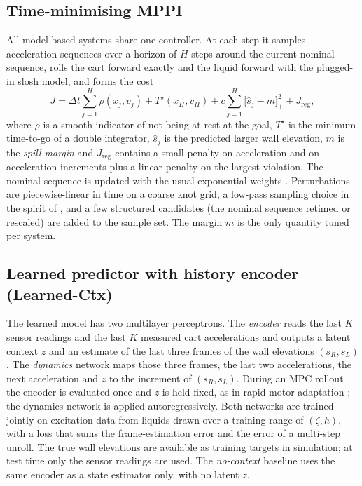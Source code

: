 \subsection{Time-minimising MPPI}
All model-based systems share one controller. At each step it samples acceleration sequences over a horizon of $H$ steps around the current nominal sequence, rolls the cart forward exactly and the liquid forward with the plugged-in slosh model, and forms the cost
\begin{equation}
J=\Delta t\sum_{j=1}^{H}\rho(x_j,v_j)+T^\star(x_H,v_H)+c\!\sum_{j=1}^{H}\!\big[\hat s_j-m\big]_+^2+J_{\mathrm{reg}},
\end{equation}
where $\rho$ is a smooth indicator of not being at rest at the goal, $T^\star$ is the minimum time-to-go of a double integrator, $\hat s_j$ is the predicted larger wall elevation, $m$ is the \emph{spill margin} and $J_{\mathrm{reg}}$ contains a small penalty on acceleration and on acceleration increments plus a linear penalty on the largest violation. The nominal sequence is updated with the usual exponential weights \cite{asmar2022model}. Perturbations are piecewise-linear in time on a coarse knot grid, a low-pass sampling choice in the spirit of \cite{kicki2025lp}, and a few structured candidates (the nominal sequence retimed or rescaled) are added to the sample set. The margin $m$ is the only quantity tuned per system.

\subsection{Learned predictor with history encoder (Learned-Ctx)}
The learned model has two multilayer perceptrons. The \emph{encoder} reads the last $K$ sensor readings and the last $K$ measured cart accelerations and outputs a latent context $z$ and an estimate of the last three frames of the wall elevations $(s_R,s_L)$. The \emph{dynamics} network maps those three frames, the last two accelerations, the next acceleration and $z$ to the increment of $(s_R,s_L)$. During an MPC rollout the encoder is evaluated once and $z$ is held fixed, as in rapid motor adaptation \cite{kumar2021rma}; the dynamics network is applied autoregressively. Both networks are trained jointly on excitation data from liquids drawn over a training range of $(\zeta,h)$, with a loss that sums the frame-estimation error and the error of a multi-step unroll. The true wall elevations are available as training targets in simulation; at test time only the sensor readings are used. The \emph{no-context} baseline uses the same encoder as a state estimator only, with no latent $z$.

